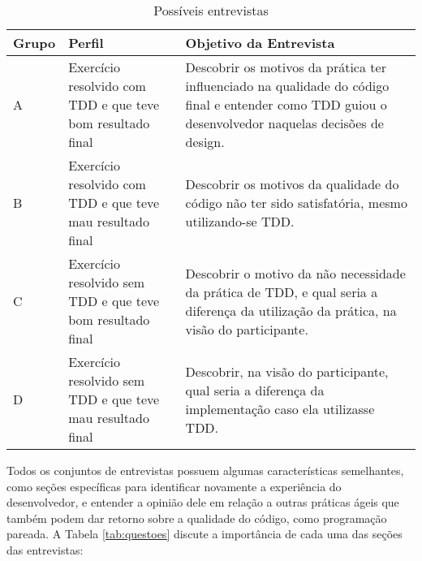 \begin{table}[h!]
	\begin{tabular}{ | p{2cm} | p{5cm} | p{7cm} |}
		\hline
		Grupo & Perfil & Objetivo da Entrevista \\ \hline
		
		A & Exercício resolvido com TDD e que teve bom resultado final
		& 
		Descobrir os motivos da prática ter influenciado na qualidade do código final e
		entender como TDD guiou o desenvolvedor naquelas decisões de design.
		
		\\ \hline
		
		B & Exercício resolvido com TDD e que teve mau resultado final
		&
		Descobrir os motivos da qualidade do código não ter sido satisfatória,
		mesmo utilizando-se TDD.
		
		\\ \hline
			
		C & Exercício resolvido sem TDD e que teve bom resultado final
		&
		Descobrir o motivo da não necessidade da prática de TDD, e qual seria a diferença
		da utilização da prática, na visão do participante.
		
		\\ \hline
		
		D & Exercício resolvido sem TDD e que teve mau resultado final
		&
		Descobrir, na visão do participante, qual seria a diferença da implementação
		caso ela utilizasse TDD.
		
		\\ \hline
		
	\end{tabular}
	\caption{Possíveis entrevistas}
	\label{tab:possiveis-entrevistas}
\end{table}

Todos os conjuntos de entrevistas possuem algumas características semelhantes,
como seções específicas para identificar novamente a experiência do desenvolvedor,
e entender a opinião dele em relação a outras práticas ágeis que também podem
dar retorno sobre a qualidade do código, como programação pareada. A Tabela \ref{tab:questoes}
discute a importância de cada uma das seções das entrevistas:

